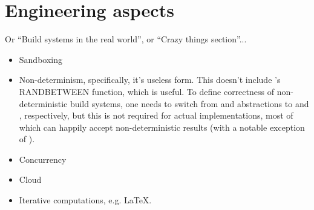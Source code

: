 \clearpage
\section{Engineering aspects}\label{sec-engineering}

Or ``Build systems in the real world'', or ``Crazy things section''...

\begin{itemize}
    \item Sandboxing
    \item Non-determinism, specifically, it's useless form. This doesn't
          include \Excel's \textsf{RANDBETWEEN} function, which is useful.
          To define correctness of non-deterministic build systems, one needs to
          switch from  and  abstractions to
           and , respectively, but this is not
          required for actual implementations, most of which can happily accept
          non-deterministic results (with a notable exception of \Buck).
    \item Concurrency
    \item Cloud
    \item Iterative computations, e.g. LaTeX.
\end{itemize}
